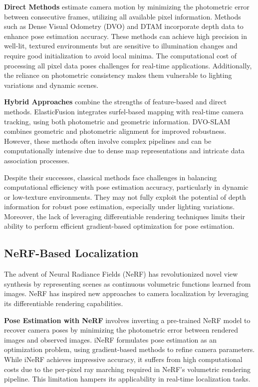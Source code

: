\documentclass[twocolumn]{article}
\begin{document}
\textbf{Direct Methods}\autocite{engelDirectSparseOdometry2017} estimate
camera motion by minimizing the photometric error between consecutive
frames, utilizing all available pixel information. Methods such as Dense
Visual Odometry (DVO)
\autocite{kerlDenseVisualSLAM2013,kerlRobustOdometryEstimation2013} and
DTAM\autocite{newcombeDTAMDenseTracking2011} incorporate depth data to
enhance pose estimation accuracy. These methods can achieve high
precision in well-lit, textured environments but are sensitive to
illumination changes and require good initialization to avoid local
minima. The computational cost of processing all pixel data poses
challenges for real-time applications. Additionally, the reliance on
photometric consistency makes them vulnerable to lighting variations and
dynamic scenes.

\textbf{Hybrid Approaches} combine the strengths of feature-based and
direct methods. ElasticFusion
\autocite{whelanElasticFusionRealtimeDense2016} integrates surfel-based
mapping with real-time camera tracking, using both photometric and
geometric information. DVO-SLAM
\autocite{kerlRobustOdometryEstimation2013} combines geometric and
photometric alignment for improved robustness. However, these methods
often involve complex pipelines and can be computationally intensive due
to dense map representations and intricate data association processes.

Despite their successes, classical methods face challenges in balancing
computational efficiency with pose estimation accuracy, particularly in
dynamic or low-texture environments. They may not fully exploit the
potential of depth information for robust pose estimation, especially
under lighting variations. Moreover, the lack of leveraging
differentiable rendering techniques limits their ability to perform
efficient gradient-based optimization for pose estimation.

\subsection{NeRF-Based Localization}\label{nerf-based-localization}

The advent of Neural Radiance Fields (NeRF)
\autocite{mildenhallNeRFRepresentingScenes2022} has revolutionized novel
view synthesis by representing scenes as continuous volumetric functions
learned from images. NeRF has inspired new approaches to camera
localization by leveraging its differentiable rendering capabilities.

\textbf{Pose Estimation with NeRF} involves inverting a pre-trained NeRF
model to recover camera poses by minimizing the photometric error
between rendered images and observed images. iNeRF
\autocite{yen-chenInerfInvertingNeural2021} formulates pose estimation
as an optimization problem, using gradient-based methods to refine
camera parameters. While iNeRF achieves impressive accuracy, it suffers
from high computational costs due to the per-pixel ray marching required
in NeRF's volumetric rendering pipeline. This limitation hampers its
applicability in real-time localization tasks.
\end{document}

